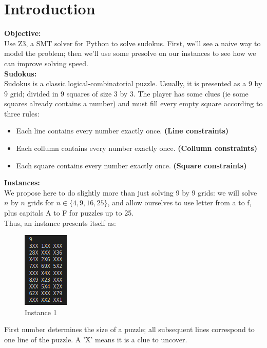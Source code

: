 \documentclass[12pt]{article}
\begin{document}
\section*{Introduction}
\textbf{Objective:}\\
Use Z3, a SMT solver for Python to solve sudokus. First, we'll see a naive way to model the problem; then we'll use some presolve on our instances to see how we can improve solving speed. \\

\textbf{Sudokus:}\\
Sudokus is a classic logical-combinatorial puzzle. Usually, it is presented as a 9 by 9 grid; divided in 9 squares of size 3 by 3. 
The player has some clues (ie some squares already contains a number) and must fill every empty square according to three rules:

\begin{itemize}
    \item Each line contains every number exactly once. \textbf{(Line constraints)}
    \item Each collumn contains every number exactly once. \textbf{(Collumn constraints)}
    \item Each square contains every number exactly once. \textbf{(Square constraints)} 
\end{itemize}

\textbf{Instances:}\\
We propose here to do slightly more than just solving 9 by 9 grids: we will solve $n$ by $n$ grids for $n \in \{4, 9, 16, 25 \}$, and allow ourselves to use letter from a to f, plus capitals A to F for puzzles up to 25.\\
Thus, an instance presents itself as: \\

\begin{figure}[H]
    \centering
    \includegraphics[scale = 0.8]{images/instance_2.png}
    \caption{Instance 1}
\end{figure}

First number determines the size of a puzzle; all subsequent lines correspond to one line of the puzzle. A 'X' means it is a clue to uncover. 
\end{document}
